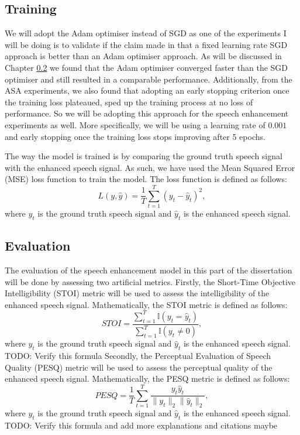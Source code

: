 \documentclass[logo,bsc,singlespacing,parskip,online]{infthesis}
\begin{document}
\subsection{Training}
We will adopt the Adam optimiser instead of SGD as one of the experiments I will be doing 
is to validate if the claim made in \citet{Huwel2020HearDS} that a fixed learning rate SGD approach
is better than an Adam optimiser approach. As will be discussed in Chapter \ref{} 
we found that the Adam optimiser converged faster than the SGD optimiser and still resulted in a comparable 
performance. Additionally, from the ASA experiments, we also found that adopting an early stopping criterion 
once the training loss plateaued, sped up the training process at no loss of performance. So we will be adopting 
this approach for the speech enhancement experiments as well. More specifically, we will be using a learning rate of $0.001$
and early stopping once the training loss stops improving after 5 epochs.

The way the model is trained is by comparing the ground truth speech signal with the enhanced speech signal. 
As such, we have used the Mean Squared Error (MSE) loss function to train the model. The loss function is defined as follows:
\[
L(y, \hat{y}) = \frac{1}{T} \sum_{t=1}^{T} (y_t - \hat{y}_t)^2,
\]
where \(y_t\) is the ground truth speech signal and \(\hat{y}_t\) is the enhanced speech signal.

\subsection{Evaluation}
The evaluation of the speech enhancement model in this part of the dissertation will be 
done by assessing two artificial metrics.
Firstly, the Short-Time Objective Intelligibility (STOI) metric will be used to assess the intelligibility of the enhanced speech signal.
Mathematically, the STOI metric is defined as follows:
\[
STOI = \frac{\sum_{t=1}^{T} \mathbb{I}(y_t = \hat{y}_t)}{\sum_{t=1}^{T} \mathbb{I}(y_t \neq 0)},
\]
where \(y_t\) is the ground truth speech signal and \(\hat{y}_t\) is the enhanced speech signal.
TODO: Verify this formula
Secondly, the Perceptual Evaluation of Speech Quality (PESQ) metric will be used to assess the perceptual quality of the enhanced speech signal.
Mathematically, the PESQ metric is defined as follows:
\[
PESQ = \frac{1}{T} \sum_{t=1}^{T} \frac{y_t \hat{y}_t}{\|y_t\|_2 \|\hat{y}_t\|_2},
\]
where \(y_t\) is the ground truth speech signal and \(\hat{y}_t\) is the enhanced speech signal.
TODO: Verify this formula and add more explanations and citations maybe
\end{document}
